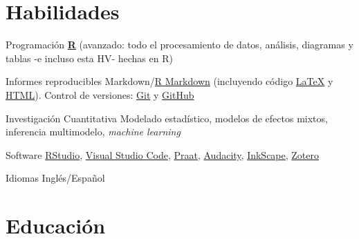 \documentclass[11pt,a4paper,]{awesome-cv}
\begin{document}
\hypertarget{habilidades}{%
\section{Habilidades}\label{habilidades}}

\begin{cvskills}
  \cvskill
    {Programación}
    {\href{https://www.r-project.org/}{\textbf{R}} (avanzado: todo el procesamiento de datos, análisis, diagramas y tablas -e incluso esta HV- hechas en R)}

  \cvskill
    {Informes reproducibles}
    {Markdown/\href{https://rmarkdown.rstudio.com/}{R Markdown} (incluyendo código  \href{https://www.latex-project.org/}{{\selectfont\LaTeX}} y \href{https://html.spec.whatwg.org/}{HTML}). Control de versiones: \href{https://git-scm.com/}{Git} \faGit* y \href{https://github.com/JDLeongomez}{GitHub} \faGithub}

  \cvskill
    {Investigación Cuantitativa}
    {Modelado estadístico, modelos de efectos mixtos, inferencia multimodelo, \textit{machine learning}}

  \cvskill
    {Software}
    {\href{https://posit.co/products/open-source/rstudio/}{RStudio}, \href{https://code.visualstudio.com/}{Visual Studio Code}, \href{https://www.fon.hum.uva.nl/praat/}{Praat}, \href{https://www.audacityteam.org/}{Audacity}, \href{https://inkscape.org/}{InkScape}, \href{https://www.zotero.org/}{Zotero}}

  \cvskill
    {Idiomas}
    {Inglés/Español}
\end{cvskills}

\hypertarget{educaciuxf3n}{%
\section{Educación}\label{educaciuxf3n}}

\begin{cventries}
    \vspace{-4.0mm}
    \vspace{-4.0mm}
    \vspace{-4.0mm}
\end{cventries}
\end{document}
